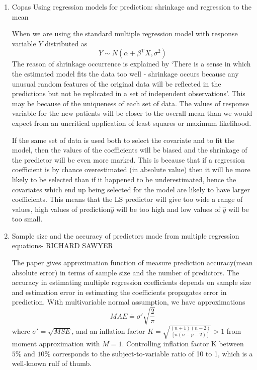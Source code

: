\documentclass[
11pt, %
english, %
singlespacing, %
headsepline, %
]{MastersDoctoralThesis} %
\begin{document}
\begin{enumerate}
\begin{itemize}
\end{itemize}

\item Copas Using regression models for prediction: shrinkage and regression to the mean

When we are using the standard multiple regression model with response variable $Y$ distributed as
$$Y\sim N(\alpha +{\beta}^\mathrm{T}X, \sigma^2)$$
The reason of shrinkage occurrence is explained by ‘There is a sense in which the estimated model fits the data too well - shrinkage occurs because any unusual random features of the original data will be reflected in the predictions but not be replicated in a set of independent observations’. This may be because of the uniqueness of each set of data. The values of response variable for the new patients will be closer to the overall mean than we would expect from an uncritical application of least squares or maximum likelihood.

If the same set of data is used both to select the covariate and to fit the model, then the values of the coefficients will be biased and the shrinkage of the predictor will be even more marked. This is because that if a regression coefficient is by chance overestimated (in absolute value) then it will be more likely to be selected than if it happened to be underestimated, hence the covariates which end up being selected for the model are likely to have larger coefficients. This means that the LS predictor will give too wide a range of values, high values of prediction$\hat{y}$ will be too high and low values of $\hat{y}$ will be too small. \\
 
\item  Sample size and the accuracy of predictors made from multiple regression equations- RICHARD SAWYER

The paper gives approximation function of measure prediction accuracy(mean absolute error) in terms of sample size and the number of predictors. The accuracy in estimating multiple regression coefficients depends on sample size and estimation error in estimating the coefficients propagates error in prediction. With  multivariable normal assumption, we have approximations
$$ MAE \doteq \sigma\prime\sqrt{\frac{2}{\pi}}$$
where $\sigma\prime = \sqrt{MSE}$, and an inflation factor $K=\sqrt{\frac{(n+1)(n-2)}{[n(n-p-2)]}}>1$ from moment approximation with $M=1$. Controlling inflation factor K between $5\%$ and $10\%$ corresponds to the subject-to-variable ratio of 10 to 1, which is a well-known rulf of thumb.



\end{enumerate}
\end{document}
